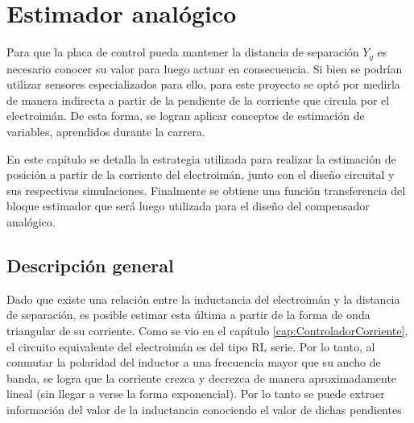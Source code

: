 \chapter{Estimador analógico}  \label{cap:Estimador Analogico}


 Para que la placa de control pueda mantener la distancia de separación $Y_{g}$ es necesario conocer su valor  para luego actuar en consecuencia. Si bien se podrían utilizar sensores  especializados para ello, para este proyecto se optó por medirla de manera indirecta a partir de la pendiente de la corriente que circula por el electroimán. De esta forma, se logran aplicar conceptos de estimación de variables, aprendidos durante la carrera. 
 
 En este capítulo se detalla la estrategia utilizada para realizar la estimación de posición a partir de la corriente del electroimán, junto con el diseño circuital y sus respectivas simulaciones. Finalmente se obtiene una función transferencia del bloque estimador que será luego utilizada para el diseño del compensador analógico.

\section{Descripción general}


Dado que existe una relación entre la inductancia del electroimán y la distancia de separación, es posible estimar esta última a partir de la forma de onda triangular de su corriente. Como se vio en el capítulo \ref{cap:ControladorCorriente}, el circuito equivalente del electroimán es del tipo RL serie. Por lo tanto, al conmutar la polaridad del inductor a una frecuencia mayor que su ancho de banda, se logra que la corriente crezca y decrezca de manera aproximadamente lineal (sin llegar a verse la forma exponencial). Por lo tanto se puede extraer información del valor de la inductancia conociendo el valor de dichas pendientes

